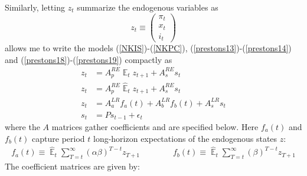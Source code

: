 \documentclass[11pt]{article}
\renewcommand{\[}{\begin{equation}}
\renewcommand{\]}{\end{equation}}
\DeclareMathOperator{\E}{\mathbb{E}}
\begin{document}
 Similarly, letting $z_t$ summarize the endogenous variables as
 \begin{equation}
 z_t \equiv \begin{pmatrix} \pi_t \\ x_t \\ i_t
 \end{pmatrix}
 \end{equation}
 allows me to write the models (\ref{NKIS})-(\ref{NKPC}), (\ref{prestons13})-(\ref{prestons14}) and (\ref{prestons18})-(\ref{prestons19}) compactly as
 \begin{align}
z_t & = A_p^{RE} \E_t z_{t+1} + A_s^{RE} s_t \label{LOM_RE} \\
z_t & = A_p^{RE} \hat{\E}_t z_{t+1} + A_s^{RE} s_t \label{LOM_EE} \\
z_t & = A_a^{LR} f_a(t) + A_b^{LR} f_b(t) + A_s^{LR} s_t \label{LOM_LR} \\
s_t & = P s_{t-1} + \epsilon_t \label{exog}
\end{align}
 where the $A$ matrices gather coefficients and are specified below. Here $f_a(t)$ and $f_b(t)$ capture period $t$ long-horizon expectations of the endogenous states $z$:
  \begin{align}
f_a(t)  \equiv  \hat{\E}_t\sum_{T=t}^{\infty} (\alpha\beta)^{T-t } z_{T+1} \quad \quad \quad \quad f_b(t)  \equiv \hat{\E}_t\sum_{T=t}^{\infty} (\beta)^{T-t } z_{T+1} \label{fafb}
\end{align}
The coefficient matrices are given by:
\end{document}
